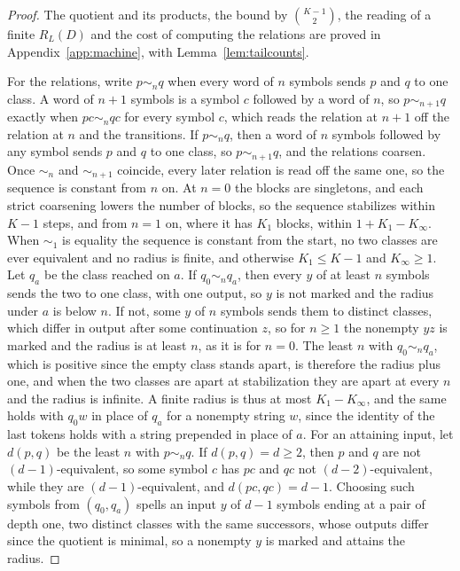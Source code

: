 \documentclass[11pt,a4paper]{article}
\theoremstyle{definition}
\theoremstyle{plain}
\newcommand{\ripple}{R_{L}}
\begin{document}
\begin{proof}
The quotient and its products, the bound by \(\binom{K - 1}{2}\), the reading of a finite \(\ripple(D)\) and the cost of
computing the relations are proved in Appendix~\ref{app:machine}, with Lemma~\ref{lem:tailcounts}.

For the relations, write \(p \sim_n q\) when every word of \(n\) symbols sends \(p\) and \(q\) to one class. A word of
\(n + 1\) symbols is a symbol \(c\) followed by a word of \(n\), so \(p \sim_{n+1} q\) exactly when \(pc \sim_n qc\) for
every symbol \(c\), which reads the relation at \(n + 1\) off the relation at \(n\) and the transitions. If
\(p \sim_n q\), then a word of \(n\) symbols followed by any symbol sends \(p\) and \(q\) to one class, so
\(p \sim_{n+1} q\), and the relations coarsen. Once \(\sim_n\) and \(\sim_{n+1}\) coincide, every later relation is read
off the same one, so the sequence is constant from \(n\) on. At \(n = 0\) the blocks are singletons, and each strict
coarsening lowers the number of blocks, so the sequence stabilizes within \(K - 1\) steps, and from \(n = 1\) on, where
it has \(K_1\) blocks, within \(1 + K_1 - K_\infty\). When \(\sim_1\) is equality the sequence is constant from the
start, no two classes are ever equivalent and no radius is finite, and otherwise \(K_1 \le K - 1\) and
\(K_\infty \ge 1\). Let \(q_a\) be the class reached on \(a\). If \(q_0 \sim_n q_a\), then every \(y\) of at least \(n\)
symbols sends the two to one class, with one output, so \(y\) is not marked and the radius under \(a\) is below \(n\).
If not, some \(y\) of \(n\) symbols sends them to distinct classes, which differ in output after some continuation
\(z\), so for \(n \ge 1\) the nonempty \(yz\) is marked and the radius is at least \(n\), as it is for \(n = 0\). The
least \(n\) with \(q_0 \sim_n q_a\), which is positive since the empty class stands apart, is therefore the radius plus
one, and when the two classes are apart at stabilization they are apart at every \(n\) and the radius is infinite. A
finite radius is thus at most \(K_1 - K_\infty\), and the same holds with \(q_0 w\) in place of \(q_a\) for a nonempty
string \(w\), since the identity of the last tokens holds with a string prepended in place of \(a\). For an attaining
input, let \(d(p, q)\) be the least \(n\) with \(p \sim_n q\). If \(d(p, q) = d \ge 2\), then \(p\) and \(q\) are not
\((d - 1)\)-equivalent, so some symbol \(c\) has \(pc\) and \(qc\) not \((d - 2)\)-equivalent, while they are
\((d - 1)\)-equivalent, and \(d(pc, qc) = d - 1\). Choosing such symbols from \((q_0, q_a)\) spells an input \(y\) of
\(d - 1\) symbols ending at a pair of depth one, two distinct classes with the same successors, whose outputs differ
since the quotient is minimal, so a nonempty \(y\) is marked and attains the radius.


\end{proof}
\end{document}
